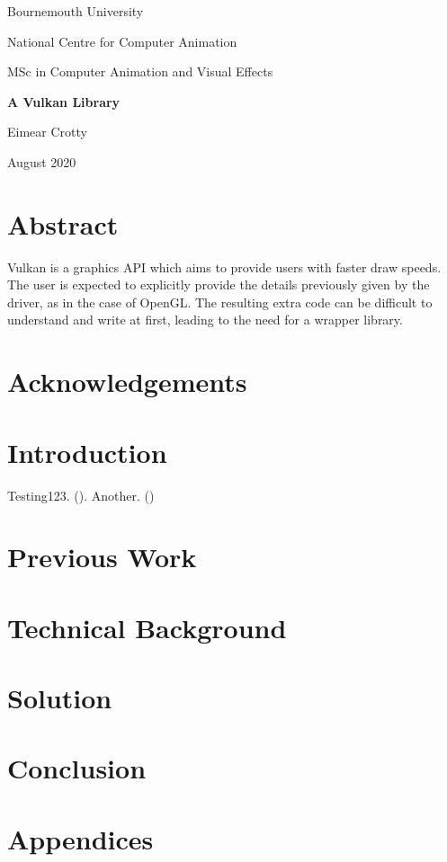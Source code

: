 \documentclass[12pt]{report}
\newcommand{\citebu}[1]{\citeauthor{#1} (\citeyear{#1})}
\theoremstyle{definition}
\begin{document}
  \renewcommand{\familydefault}{\sfdefault}
  \selectfont

  \begin{titlepage}
    \centering
    {\Huge Bournemouth University\par}
    \vspace{1cm}
    {\Large National Centre for Computer Animation\par}
    \vspace{1cm}
    {\Large MSc in Computer Animation and Visual Effects\par}
    \vspace{4cm}
    {\huge\bfseries A Vulkan Library\par}
    \vspace{1.5cm}
    {\Large Eimear Crotty\par}
    \vfill
    {\Large August 2020}
  \end{titlepage}

  \chapter*{Abstract}
    Vulkan is a graphics API which aims to provide users with faster draw speeds.
    The user is expected to explicitly provide the details previously given by
    the driver, as in the case of OpenGL. The resulting extra code can be
    difficult to understand and write at first, leading to the need for a 
    wrapper library.

  \chapter*{Acknowledgements}

    \vspace{1cm}

  \tableofcontents

  \chapter{Introduction}
    Testing123. \citebu{attiya1995sharing}. Another. \citebu{beyer2016site}

  \chapter{Previous Work}

  \chapter{Technical Background}

  \chapter{Solution}

  \chapter{Conclusion}

  
  

  \chapter{Appendices}
  
\end{document}
